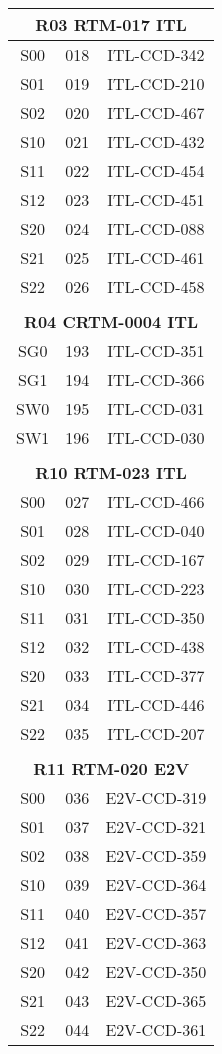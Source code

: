 \begin{longtable}{ccc}
\multicolumn{3}{c}{\bf R03  RTM-017  ITL} \\
\hline
  S00 & 018 & ITL-CCD-342 \\
  S01 & 019 & ITL-CCD-210 \\
  S02 & 020 & ITL-CCD-467 \\
  S10 & 021 & ITL-CCD-432 \\
  S11 & 022 & ITL-CCD-454 \\
  S12 & 023 & ITL-CCD-451 \\
  S20 & 024 & ITL-CCD-088 \\
  S21 & 025 & ITL-CCD-461 \\
  S22 & 026 & ITL-CCD-458 \\
 & & \\
\multicolumn{3}{c}{\bf R04  CRTM-0004  ITL} \\
\hline
  SG0 & 193 & ITL-CCD-351 \\
  SG1 & 194 & ITL-CCD-366 \\
  SW0 & 195 & ITL-CCD-031 \\
  SW1 & 196 & ITL-CCD-030 \\
 & & \\
\multicolumn{3}{c}{\bf R10  RTM-023  ITL} \\
\hline
  S00 & 027 & ITL-CCD-466 \\
  S01 & 028 & ITL-CCD-040 \\
  S02 & 029 & ITL-CCD-167 \\
  S10 & 030 & ITL-CCD-223 \\
  S11 & 031 & ITL-CCD-350 \\
  S12 & 032 & ITL-CCD-438 \\
  S20 & 033 & ITL-CCD-377 \\
  S21 & 034 & ITL-CCD-446 \\
  S22 & 035 & ITL-CCD-207 \\
 & & \\
\multicolumn{3}{c}{\bf R11  RTM-020  E2V} \\
\hline
  S00 & 036 & E2V-CCD-319 \\
  S01 & 037 & E2V-CCD-321 \\
  S02 & 038 & E2V-CCD-359 \\
  S10 & 039 & E2V-CCD-364 \\
  S11 & 040 & E2V-CCD-357 \\
  S12 & 041 & E2V-CCD-363 \\
  S20 & 042 & E2V-CCD-350 \\
  S21 & 043 & E2V-CCD-365 \\
  S22 & 044 & E2V-CCD-361 \\

\end{longtable}
